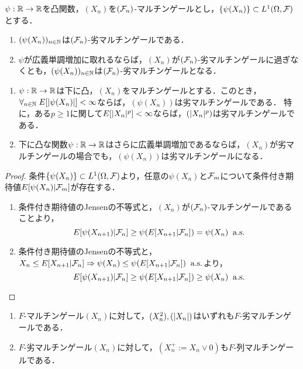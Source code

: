 \documentclass[uplatex,dvipdfmx]{jsreport}
\begin{document}
\begin{lemma}[劣マルチンゲールの構成]
    $\psi:\mathbb{R}\to\mathbb{R}$を凸関数，$(X_n)$を$(\mathcal{F}_n)$-マルチンゲールとし，$\{\psi(X_n)\}\subset L^1(\Omega,\mathcal{F})$とする．
    \begin{enumerate}
        \item $(\psi(X_n))_{n\in\mathbb{N}}$は$(\mathcal{F}_n)$-劣マルチンゲールである．
        \item $\psi$が広義単調増加に取れるならば，$(X_n)$が$(\mathcal{F}_n)$-劣マルチンゲールに過ぎなくとも，$(\psi(X_n))_{n\in\mathbb{N}}$は$(\mathcal{F}_n)$-劣マルチンゲールとなる．
    \end{enumerate}
    \begin{enumerate}
        \item $\psi:\mathbb{R}\to\mathbb{R}$は下に凸，$(X_n)$をマルチンゲールとする．このとき，$\forall_{n\in\mathbb{N}}\;E[\lvert\psi(X_n)\rvert]<\infty$ならば，$(\psi(X_n))$は劣マルチンゲールである．
        特に，ある$p\ge1$に関して$E[\lvert X_n\rvert^p]<\infty$ならば，$(\lvert X_n\rvert^p)$は劣マルチンゲールである．
        \item 下に凸な関数$\psi:\mathbb{R}\to\mathbb{R}$はさらに広義単調増加であるならば，$(X_n)$が劣マルチンゲールの場合でも，$(\psi(X_n))$は劣マルチンゲールになる．
    \end{enumerate}
\end{lemma}
\begin{proof}
    条件$\{\psi(X_n)\}\subset L^1(\Omega,\mathcal{F})$より，任意の$\psi(X_n)$と$\mathcal{F}_m$について条件付き期待値$E[\psi(X_n)|\mathcal{F}_m]$が存在する．
    \begin{enumerate}
        \item 条件付き期待値のJensenの不等式と，$(X_n)$が$(\mathcal{F}_n)$-マルチンゲールであることより，
        \[E[\psi(X_{n+1})|\mathcal{F}_n]\ge\psi(E[X_{n+1}|\mathcal{F}_n])=\psi(X_n)\;\;\mathrm{a.s.}\]
        \item 条件付き期待値のJensenの不等式と，$X_n\le E[X_{n+1}|\mathcal{F}_n]\Rightarrow\psi(X_n)\le\psi(E[X_{n+1}|\mathcal{F}_n])\;\;\mathrm{a.s.}$より，
        \[E[\psi(X_{n+1})|\mathcal{F}_n]\ge\psi(E[X_{n+1}|\mathcal{F}_n])\ge\psi(X_n)\;\;\mathrm{a.s.}\]
    \end{enumerate}
\end{proof}
\begin{example}[マルチンゲールに付属する劣マルチンゲール]\mbox{}
    \begin{enumerate}
        \item $F$-マルチンゲール$(X_n)$に対して，$(X_n^2),(\lvert X_n\rvert)$はいずれも$F$-劣マルチンゲールである．
        \item $F$-劣マルチンゲール$(X_n)$に対して，$(X_n^+:=X_n\lor0)$も$F$-列マルチンゲールである．
    \end{enumerate}
\end{example}
\end{document}
